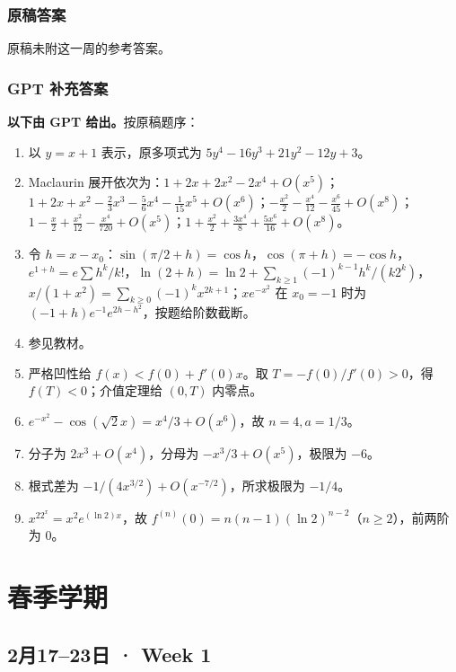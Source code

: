 \documentclass[UTF8,11pt, a4paper, oneside, fontset=none]{ctexbook}
\begin{document}
\clearpage

\subsection*{原稿答案}

\noindent 原稿未附这一周的参考答案。

\clearpage

\subsection*{GPT 补充答案}

\noindent\textbf{以下由 GPT 给出。}按原稿题序：
\begin{enumerate}
\item 以 $y=x+1$ 表示，原多项式为 $5y^4-16y^3+21y^2-12y+3$。
\item Maclaurin 展开依次为：$1+2x+2x^2-2x^4+O(x^5)$；$1+2x+x^2-\frac23x^3-\frac56x^4-\frac1{15}x^5+O(x^6)$；$-\frac{x^2}{2}-\frac{x^4}{12}-\frac{x^6}{45}+O(x^8)$；$1-\frac{x}{2}+\frac{x^2}{12}-\frac{x^4}{720}+O(x^5)$；$1+\frac{x^2}{2}+\frac{3x^4}{8}+\frac{5x^6}{16}+O(x^8)$。
\item 令 $h=x-x_0$：$\sin(\pi/2+h)=\cos h$，$\cos(\pi+h)=-\cos h$，$e^{1+h}=e\sum h^k/k!$，$\ln(2+h)=\ln2+\sum_{k\ge1}(-1)^{k-1}h^k/(k2^k)$，$x/(1+x^2)=\sum_{k\ge0}(-1)^kx^{2k+1}$；$x e^{-x^2}$ 在 $x_0=-1$ 时为 $(-1+h)e^{-1}e^{2h-h^2}$，按题给阶数截断。
\item 参见教材。
\item 严格凹性给 $f(x)<f(0)+f'(0)x$。取 $T=-f(0)/f'(0)>0$，得 $f(T)<0$；介值定理给 $(0,T)$ 内零点。
\item $e^{-x^2}-\cos(\sqrt2x)=x^4/3+O(x^6)$，故 $n=4,a=1/3$。
\item 分子为 $2x^3+O(x^4)$，分母为 $-x^3/3+O(x^5)$，极限为 $-6$。
\item 根式差为 $-1/(4x^{3/2})+O(x^{-7/2})$，所求极限为 $-1/4$。
\item $x^22^x=x^2e^{(\ln2)x}$，故 $f^{(n)}(0)=n(n-1)(\ln2)^{n-2}$（$n\ge2$），前两阶为 $0$。
\end{enumerate}

\clearpage

\chapter{春季学期}

\clearpage

\section{2月17--23日 · Week 1}
\end{document}
